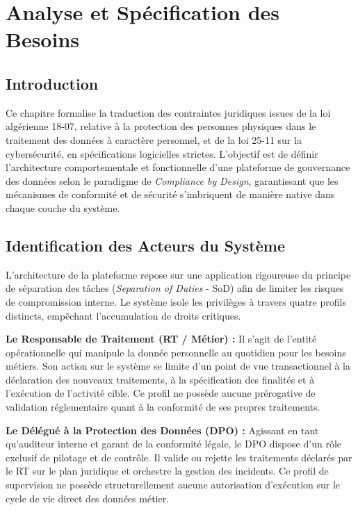 \chapter{Analyse et Spécification des Besoins}
\label{ch:analyse_specifications}

\section{Introduction}
Ce chapitre formalise la traduction des contraintes juridiques issues de la loi algérienne 18-07, relative à la protection des personnes physiques dans le traitement des données à caractère personnel, et de la loi 25-11 sur la cybersécurité, en spécifications logicielles strictes. L'objectif est de définir l'architecture comportementale et fonctionnelle d'une plateforme de gouvernance des données selon le paradigme de \textit{Compliance by Design}, garantissant que les mécanismes de conformité et de sécurité s'imbriquent de manière native dans chaque couche du système.

\section{Identification des Acteurs du Système}
L'architecture de la plateforme repose sur une application rigoureuse du principe de séparation des tâches (\textit{Separation of Duties} - SoD) afin de limiter les risques de compromission interne. Le système isole les privilèges à travers quatre profils distincts, empêchant l'accumulation de droits critiques. 

\textbf{Le Responsable de Traitement (RT / Métier) :} Il s'agit de l'entité opérationnelle qui manipule la donnée personnelle au quotidien pour les besoins métiers. Son action sur le système se limite d'un point de vue transactionnel à la déclaration des nouveaux traitements, à la spécification des finalités et à l'exécution de l'activité cible. Ce profil ne possède aucune prérogative de validation réglementaire quant à la conformité de ses propres traitements.

\textbf{Le Délégué à la Protection des Données (DPO) :} Agissant en tant qu'auditeur interne et garant de la conformité légale, le DPO dispose d'un rôle exclusif de pilotage et de contrôle. Il valide ou rejette les traitements déclarés par le RT sur le plan juridique et orchestre la gestion des incidents. Ce profil de supervision ne possède structurellement aucune autorisation d'exécution sur le cycle de vie direct des données métier.

